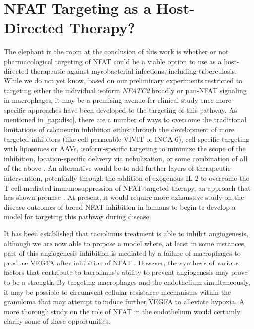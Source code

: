 \section{NFAT Targeting as a Host\hyp{}Directed Therapy?}\label{nfathdt}

The elephant in the room at the conclusion of this work is whether or not pharmacological targeting of NFAT could be a viable option to use as a host\hyp{}directed therapeutic against mycobacterial infections, including tuberculosis. While we do not yet know, based on our preliminary experiments restricted to targeting either the individual isoform \textit{NFATC2} broadly or pan\hyp{}NFAT signaling in macrophages, it may be a promising avenue for clinical study once more specific approaches have been developed to the targeting of this pathway. As mentioned in \autoref{pap:disc}, there are a number of ways to overcome the traditional limitations of calcineurin inhibition either through the development of more targeted inhibitors (like cell\hyp{}permeable VIVIT or INCA\hyp{}6), cell\hyp{}specific targeting with liposomes or AAVs, isoform\hyp{}specific targeting to minimize the scope of the inhibition, location\hyp{}specific delivery via nebulization, or some combination of all of the above \citep{Aramburu1999, Roehrl2004a, Roehrl2004b, Kitamura2021, Colombo2022}. An alternative would be to add further layers of therapeutic intervention, potentially through the addition of exogenous IL\hyp{}2 to overcome the T cell\hyp{}mediated immunosuppression of NFAT\hyp{}targeted therapy, an approach that has shown promise \citep{Whitehouse2017}. At present, it would require more exhaustive study on the disease outcomes of broad NFAT inhibition in humans to begin to develop a model for targeting this pathway during disease.

It has been established that tacrolimus treatment is able to inhibit angiogenesis, although we are now able to propose a model where, at least in some instances, part of this angiogenesis inhibition is mediated by a failure of macrophages to produce VEGFA after inhibition of NFAT \citep{Turgut2011, Shen2022}. However, the synthesis of various factors that contribute to tacrolimus's ability to prevent angiogenesis may prove to be a strength. By targeting macrophages and the endothelium simultaneously, it may be possible to circumvent cellular resistance mechanisms within the granuloma that may attempt to induce further VEGFA to alleviate hypoxia. A more thorough study on the role of NFAT in the endothelium would certainly clarify some of these opportunities. 

